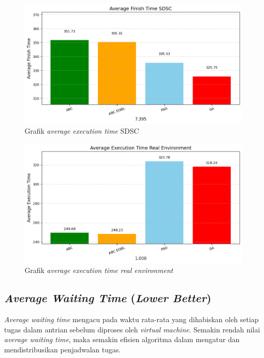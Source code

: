 \newpage

\begin{figure} [H]
    \centering
    \includegraphics[width=0.75\linewidth]{gambar/Grafik Average Execution Time SDSC.png}
    \caption{Grafik \textit{average execution time} SDSC}
\end{figure}

\begin{figure} [H]
    \centering
    \includegraphics[width=0.75\linewidth]{gambar/Grafik Average Execution Time Real Environment.png}
    \caption{Grafik \textit{average execution time real environment}}
\end{figure}

\subsection{\textit{Average Waiting Time} (\textit{Lower Better})}
\textit{Average waiting time} mengacu pada waktu rata-rata yang dihabiskan oleh setiap tugas dalam antrian sebelum diproses oleh \textit{virtual machine}. Semakin rendah nilai \textit{average waiting time}, maka semakin efisien algoritma dalam mengatur dan mendistribusikan penjadwalan tugas.

\newpage

